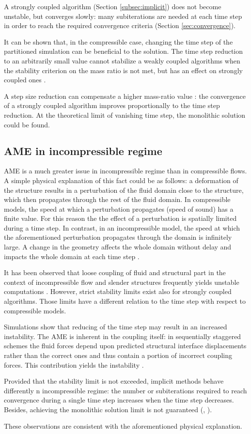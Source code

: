 A strongly coupled algorithm (Section \ref{subsec:implicit}) does not become unstable, but converges slowly: many subiterations are needed at each time step in order to reach the required convergence criteria (Section \ref{sec:convergence}).

It can be shown that, in the compressible case, changing the time step of the partitioned simulation can be beneficial to the solution. The time step reduction to an arbitrarily small value cannot stabilize a weakly coupled algorithms when the stability criterion on the mass ratio is not met, but has an effect on strongly coupled ones \cite{van2009added}.  

A step size reduction can compensate a higher mass-ratio value \cite{forster2006artificial}:
the convergence of a strongly coupled algorithm improves proportionally to the time step reduction. At the theoretical limit of vanishing time step, the monolithic solution could be found. 


\subsection{AME in incompressible regime}

AME is a much greater issue in incompressible regime than in compressible flows. A simple physical explanation of this fact could be as follows: a deformation of the structure results in a perturbation of the fluid domain close to the structure, which then propagates through the rest of the fluid domain. In compressible models, the speed at which a perturbation propagates (speed of sound) has a finite value. For this reason the the effect of a perturbation is spatially limited during a time step. In contrast, in an incompressible model, the speed at which the aforementioned perturbation propagates through the domain is infinitely large. A change in the geometry affects the whole domain without delay and impacts the whole domain at each time step \cite{causin2005added}.

It has been observed that loose coupling of fluid and structural part in the context of incompressible flow and slender structures frequently yields unstable computations \cite{forster2006artificial}. However, strict stability limits exist also for strongly coupled algorithms. Those limits have a different relation to the time step with respect to compressible models.

Simulations show that reducing of the time step may result in an increased instability. The AME is inherent in the coupling itself: in sequentially staggered schemes the fluid forces depend upon predicted structural
interface displacements rather than the correct ones and thus contain a portion of incorrect coupling forces. This contribution yields the instability \cite{degroote2008stability}.

Provided that the stability limit is not exceeded, implicit methods behave differently n incompressible regime: the number or subiterations required to reach convergence during a single time step increases when the time step decreases. Besides, achieving the monolithic solution limit is not guaranteed (\cite{forster2006artificial}, \cite{van2009added}).

These observations are consistent with the aforementioned physical explanation.
